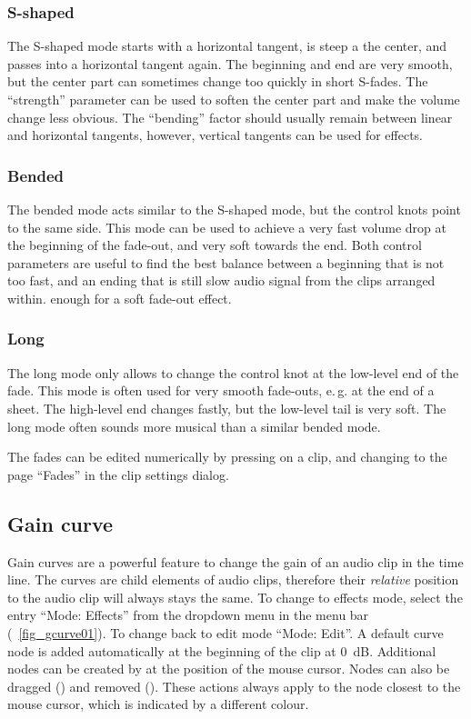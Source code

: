 \subsubsection{S-shaped}
The S-shaped mode starts with a horizontal tangent, is steep a the center, and passes into a horizontal tangent again. The beginning and end are very smooth, but the center part can sometimes change too quickly in short S-fades. The ``strength'' parameter can be used to soften the center part and make the volume change less obvious. The ``bending'' factor should usually remain between linear and horizontal tangents, however, vertical tangents can be used for effects.

\subsubsection{Bended}
The bended mode acts similar to the S-shaped mode, but the control knots point to the same side. This mode can be used to achieve a very fast volume drop at the beginning of the fade-out, and very soft towards the end. Both control parameters are useful to find the best balance between a beginning that is not too fast, and an ending that is still slow audio signal from the clips arranged within.
 enough for a soft fade-out effect.

\subsubsection{Long}
The long mode only allows to change the control knot at the low-level end of the fade. This mode is often used for very smooth fade-outs, e.\,g. at the end of a sheet. The high-level end changes fastly, but the low-level tail is very soft. The long mode often sounds more musical than a similar bended mode.

The fades can be edited numerically by pressing  on a clip, and changing to the page ``Fades'' in the clip settings dialog.

\subsection{Gain curve}
Gain curves are a powerful feature to change the gain of an audio clip in the time line. The curves are child elements of audio clips, therefore their \emph{relative} position to the audio clip will always stays the same. To change to effects mode, select the entry ``Mode: Effects'' from the dropdown menu in the menu bar (\FigB~\ref{fig_gcurve01}). To change back to edit mode ``Mode: Edit''. A default curve node is added automatically at the beginning of the clip at 0~dB. Additional nodes can be created by  at the position of the mouse cursor. Nodes can also be dragged () and removed (). These actions always apply to the node closest to the mouse cursor, which is indicated by a different colour.

